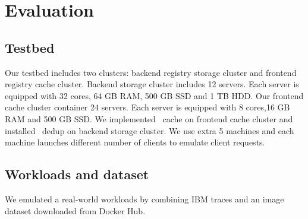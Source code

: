 \section{ Evaluation}
\label{sec:Evaluation}


\subsection{Testbed}

Our testbed includes two clusters: backend registry storage cluster and frontend registry cache cluster. Backend storage cluster includes 12 servers. Each server is equipped with 32 cores, 64 GB RAM, 500 GB SSD and 1 TB HDD. Our frontend cache cluster container 24 servers. Each server is equipped with 8 cores,16 GB RAM and 500 GB SSD. We implemented \sysname~cache on frontend cache cluster and installed \sysname~dedup on backend storage cluster. We use extra 5 machines and each machine launches different number of clients to emulate client requests.
\subsection{Workloads and dataset}
We emulated a real-world workloads by combining IBM traces and an image dataset downloaded from Docker Hub. 






